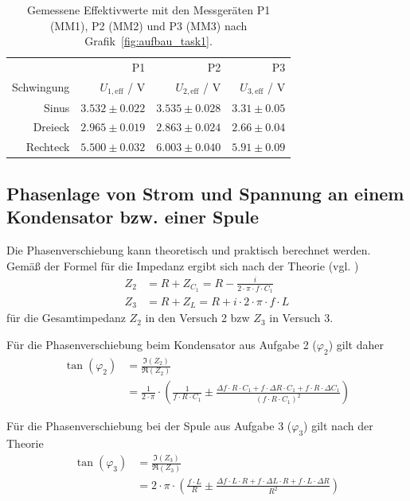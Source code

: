 \documentclass{article}
\begin{document}
\begin{table}[H]
\centering
\caption{Gemessene Effektivwerte mit den Messgeräten P1 (MM1), P2 (MM2) und P3 (MM3) nach Grafik~\ref{fig:aufbau_task1}.}
\label{tab:auswertung_task1_volt}
\begin{tabular}{r|rrr}
& P1 & P2 & P3 \\
Schwingung & $U_{1,\text{eff}}$ / V  & $U_{2,\text{eff}}$ / V & $U_{3,\text{eff}}$ / V \\
\hline
Sinus & $3.532\pm 0.022$ & $3.535 \pm 0.028$ & $3.31 \pm 0.05$ \\
Dreieck & $2.965\pm 0.019$ & $2.863 \pm 0.024$ & $2.66 \pm 0.04$ \\
Rechteck & $5.500\pm 0.032$ & $6.003 \pm 0.040$ & $5.91 \pm 0.09$
\end{tabular}
\end{table}





\subsection{Phasenlage von Strom und Spannung an einem Kondensator bzw. einer Spule}

Die Phasenverschiebung kann theoretisch und praktisch berechnet werden. Gemäß der Formel für die Impedanz ergibt sich nach der Theorie (vgl. \cite{demtroeder})
\begin{align*}
Z_2 &= R + Z_{C_1} = R - \frac{i}{2\cdot\pi\cdot f \cdot C_1} \\
Z_3 &= R + Z_{L} = R + i\cdot 2\cdot\pi\cdot f \cdot L
\end{align*}
für die Gesamtimpedanz $Z_2$ in den Versuch 2 bzw $Z_3$ in Versuch 3.

Für die Phasenverschiebung beim Kondensator aus Aufgabe 2 ($\varphi_2$) gilt daher
\begin{align*}
\tan\left(\varphi_2\right) &= \frac{\Im(Z_2)}{\Re(Z_2)} \\
&= \frac{1}{2\cdot\pi} \cdot\left(\frac{1}{ f\cdot R \cdot C_1} \pm  \frac{\Delta f\cdot R \cdot C_1 + f\cdot \Delta R \cdot C_1 + f\cdot R \cdot \Delta C_1}{ (f \cdot R\cdot C_1)^2} \right)
\end{align*}

Für die Phasenverschiebung bei der Spule aus Aufgabe 3 ($\varphi_3$) gilt nach der Theorie
\begin{align*}
\tan\left(\varphi_3\right) &= \frac{\Im(Z_3)}{\Re(Z_3)} \\
&= 2\cdot \pi\cdot \left( \frac{f \cdot L}{R} \pm \frac{\Delta f\cdot L\cdot R + f\cdot \Delta L\cdot R + f\cdot L \cdot \Delta R}{R^2} \right)
\end{align*}
\end{document}

